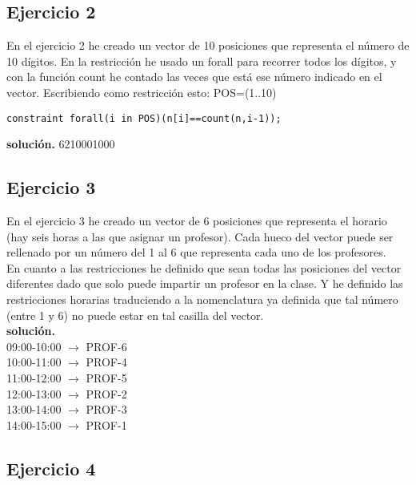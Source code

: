 \documentclass[a4paper,11pt]{article}
\begin{document}
\subsection{Ejercicio 2}

En el ejercicio 2 he creado un vector de 10 posiciones que representa el número de 10 dígitos. En la restricción he usado un forall para recorrer todos los dígitos, y con la función count he contado las veces que está ese número indicado en el vector. Escribiendo como restricción esto: POS=(1..10)

\begin{lstlisting}
constraint forall(i in POS)(n[i]==count(n,i-1));
\end{lstlisting}

\textbf{solución.} 6210001000

\subsection{Ejercicio 3}

En el ejercicio 3 he creado un vector de 6 posiciones que representa el horario (hay seis horas a las que asignar un profesor). Cada hueco del vector puede ser rellenado por un número del 1 al 6 que representa cada uno de los profesores.\\

En cuanto a las restricciones he definido que sean todas las posiciones del vector diferentes dado que solo puede impartir un profesor en la clase. Y he definido las restricciones horarias traduciendo a la nomenclatura ya definida que tal número (entre 1 y 6) no puede estar en tal casilla del vector.\\

\textbf{solución.}\\

09:00-10:00 $\longrightarrow$ PROF-6 \\
10:00-11:00 $\longrightarrow$ PROF-4 \\
11:00-12:00 $\longrightarrow$ PROF-5 \\
12:00-13:00 $\longrightarrow$ PROF-2 \\
13:00-14:00 $\longrightarrow$ PROF-3 \\
14:00-15:00 $\longrightarrow$ PROF-1 \\


\subsection{Ejercicio 4}
\end{document}
